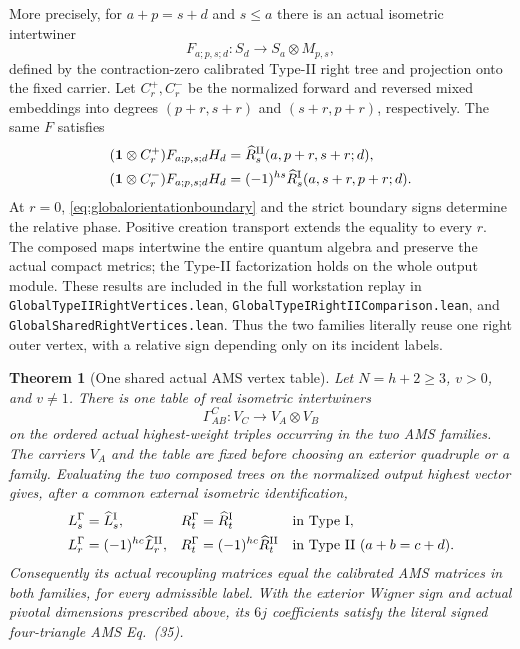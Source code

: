 \documentclass[10pt,a4paper]{article}
\newtheorem{theorem}{Theorem}
\newcommand{\id}{\mathbf 1}
\newcommand{\lean}[1]{{\small\nolinkurl{#1}}}
\newenvironment{revision}{\begingroup}{\endgroup}
\begin{document}
\begin{revision}
More precisely, for $a+p=s+d$ and $s\le a$ there is an actual
isometric intertwiner
\[
 F_{a;p,s;d}:S_d\longrightarrow S_a\otimes M_{p,s},
\]
defined by the contraction-zero calibrated Type-II right tree and
projection onto the fixed carrier. Let $C_r^+,C_r^-$ be the normalized
forward and reversed mixed embeddings into degrees $(p+r,s+r)$ and
$(s+r,p+r)$, respectively. The same $F$ satisfies
\begin{align}
 (\id\otimes C_r^+)F_{a;p,s;d}H_d
   &=\widehat R_s^{\rm II}(a,p+r,s+r;d),\notag\\
 (\id\otimes C_r^-)F_{a;p,s;d}H_d
   &=(-1)^{hs}\widehat R_s^{\rm I}(a,s+r,p+r;d).
 \label{eq:globalsharedright}
\end{align}
At $r=0$, \eqref{eq:globalorientationboundary} and the strict boundary
signs determine the relative phase. Positive creation transport extends
the equality to every $r$. The composed maps intertwine the entire
quantum algebra and preserve the actual compact metrics; the Type-II
factorization holds on the whole output module. These results are included in the full
workstation replay in
\lean{GlobalTypeIIRightVertices.lean},
\lean{GlobalTypeIRightIIComparison.lean}, and
\lean{GlobalSharedRightVertices.lean}.
Thus the two families literally reuse one right outer vertex, with a
relative sign depending only on its incident labels.

\begin{theorem}[One shared actual AMS vertex table]\label{thm:actualAMStable}
Let $N=h+2\ge3$, $v>0$, and $v\ne1$. There is one table of real
isometric intertwiners
\[
 \Gamma_{AB}^{C}:V_C\longrightarrow V_A\otimes V_B
\]
on the ordered actual highest-weight triples occurring in the two AMS
families. The carriers $V_A$ and the table are fixed before choosing
an exterior quadruple or a family. Evaluating the two composed trees on the normalized output
highest vector gives, after a common external isometric identification,
\begin{align}
 L_s^\Gamma&=\widehat L_s^{\rm I},&
 R_t^\Gamma&=\widehat R_t^{\rm I}
 &&\text{in Type I},\notag\\
 L_r^\Gamma&=(-1)^{hc}\widehat L_r^{\rm II},&
 R_t^\Gamma&=(-1)^{hc}\widehat R_t^{\rm II}
 &&\text{in Type II }(a+b=c+d).
 \label{eq:actualAMStrees}
\end{align}
Consequently its actual recoupling matrices equal the calibrated AMS
matrices in both families, for every admissible label. With the
exterior Wigner sign and actual pivotal dimensions prescribed above,
its $6j$ coefficients satisfy the literal signed four-triangle
AMS Eq.~(35).
\end{theorem}


\end{revision}
\end{document}
